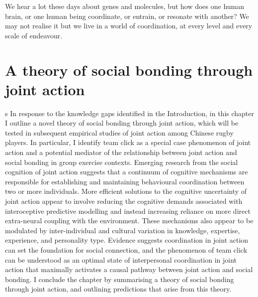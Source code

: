 
\begin{savequote}[8cm]

    We hear a lot these days about genes and molecules, but how does one human brain, or one human being coordinate, or entrain, or resonate with another?  We may not realise it but we live in a world of coordination, at every level and every scale of endeavour.

\end{savequote}




\chapter{\label{theory}A theory of social bonding through joint action}


\minitoc

s
In response to the knowledge gaps identified in the Introduction, in this chapter I outline a novel theory of social bonding through joint action, which will be tested in subsequent empirical studies of joint action among Chinese rugby players.  In particular, I identify team click as a special case phenomenon of joint action and a potential mediator of the relationship between joint action and social bonding in group exercise contexts.  Emerging research from the social cognition of joint action suggests that a continuum of cognitive mechanisms are responsible for establishing and maintaining behavioural coordination between two or more individuals.  More efficient solutions to the cognitive uncertainty of joint action appear to involve reducing the cognitive demands associated with interoceptive predictive modelling and instead increasing reliance on more direct extra-neural coupling with the environment.  These mechanisms also appear to be modulated by inter-individual and cultural variation in knowledge, expertise, experience, and personality type.  Evidence suggests coordination in joint action can set the foundation for social connection, and the phenomenon of team click can be understood as an optimal state of interpersonal coordination in joint action that maximally activates a causal pathway between joint action and social bonding.  I conclude the chapter by summarising a theory of social bonding through joint action, and outlining predictions that arise from this theory.




